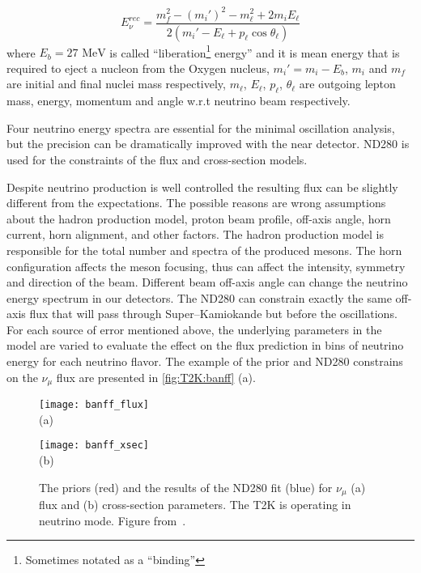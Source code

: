 \documentclass[../main.tex]{subfiles}
\begin{document}
\begin{equation}
\label{eq:t2k:sk_e}
E_\nu^{rec}=\frac{m_f^2-(m_i')^2-m_\ell^2+2m_iE_\ell}{2\left(m_i'-E_\ell+p_\ell\cos\theta_\ell\right)}
\end{equation}
where $E_b = 27\text{ MeV}$ is called ``liberation\footnote{Sometimes notated as a ``binding''} energy'' and it is mean energy that is required to eject a nucleon from the Oxygen nucleus, $m_i'=m_i-E_b$, $m_i$ and $m_f$ are initial and final nuclei mass respectively, $m_\ell$, $E_\ell$, $p_\ell$, $\theta_\ell$ are outgoing lepton mass, energy, momentum and angle w.r.t neutrino beam respectively.

Four neutrino energy spectra are essential for the minimal oscillation analysis, but the precision can be dramatically improved with the near detector. ND280 is used for the constraints of the flux and cross-section models.

Despite neutrino production is well controlled the resulting flux can be slightly different from the expectations. The possible reasons are wrong assumptions about the hadron production model, proton beam profile, off-axis angle, horn current, horn alignment, and other factors. The hadron production model is responsible for the total number and spectra of the produced mesons. The horn configuration affects the meson focusing, thus can affect the intensity, symmetry and direction of the beam. Different beam off-axis angle can change the neutrino energy spectrum in our detectors. The ND280 can constrain exactly the same off-axis flux that will pass through Super--Kamiokande but before the oscillations. For each source of error mentioned above, the underlying parameters in the model are varied to evaluate the effect on the flux prediction in bins of neutrino energy for each neutrino flavor. The example of the prior and ND280 constrains on the $\nu_\mu$ flux are presented in \autoref{fig:T2K:banff} (a).

\begin{figure}[!ht]
  \centering
  \begin{minipage}{0.49\linewidth}
    \centering
    \texttt{[image: banff\_flux]} \\ (a)
  \end{minipage}
  \begin{minipage}{0.49\linewidth}
    \centering
    \texttt{[image: banff\_xsec]} \\ (b)
  \end{minipage}
    \caption{The priors (red) and the results of the ND280 fit (blue) for $\nu_\mu$ (a) flux and (b) cross-section parameters. The T2K is operating in neutrino mode. Figure from~\cite{Abe2017}.}
    \label{fig:T2K:banff}
\end{figure}
\end{document}
